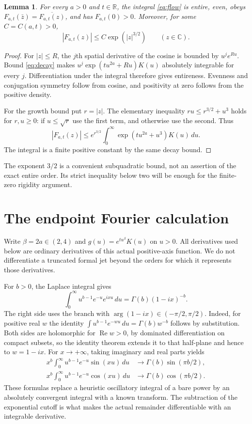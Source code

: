 \documentclass[11pt]{article}
\newtheorem{lemma}[theorem]{Lemma}
\theoremstyle{remark}\newtheorem{remark}[theorem]{Remark}
\newcommand{\R}{\mathbb R}\newcommand{\C}{\mathbb C}
\begin{document}
\begin{lemma}\label{lem:entire}
For every $a>0$ and $t\in\R$, the integral \eqref{eq:flow} is entire,
even, obeys $F_{a,t}(\bar z)=\overline{F_{a,t}(z)}$, and has
$F_{a,t}(0)>0$. Moreover, for some $C=C(a,t)>0$,
\begin{equation}\label{eq:growth}
 |F_{a,t}(z)|\leq C\exp(|z|^{3/2})\qquad(z\in\C).
\end{equation}
\end{lemma}
\begin{proof}
For $|z|\leq R$, the $j$th spatial derivative of the cosine is
bounded by $u^j e^{Ru}$. Bound \eqref{eq:decay} makes
$u^j\exp(tu^{2a}+Ru)K(u)$ absolutely integrable for every $j$.
Differentiation under the integral therefore gives entireness.
Evenness and conjugation symmetry follow from cosine, and positivity
at zero follows from the positive density.

For the growth bound put $r=|z|$. The elementary inequality
$ru\leq r^{3/2}+u^3$ holds for $r,u\geq0$: if $u\leq\sqrt r$
use the first term, and otherwise use the second. Thus
\[
 |F_{a,t}(z)|\leq e^{r^{3/2}}
 \int_0^\infty \exp(tu^{2a}+u^3)K(u)\,du.
\]
The integral is a finite positive constant by the same decay bound.
\end{proof}

The exponent $3/2$ is a convenient subquadratic bound, not an assertion
of the exact entire order. Its strict inequality below two will
be enough for the finite-zero rigidity argument.

\section{The endpoint Fourier calculation}
Write $\beta=2a\in(2,4)$ and
$g(u)=e^{tu^\beta}K(u)$ on $u>0$. All derivatives used below are
ordinary derivatives of this actual positive-axis function. We do
not differentiate a truncated formal jet beyond the orders for
which it represents those derivatives.

For $b>0$, the Laplace integral gives
\begin{equation}\label{eq:gamma}
 \int_0^\infty u^{b-1}e^{-u}e^{ixu}\,du
 =\Gamma(b)(1-ix)^{-b}.
\end{equation}
The right side uses the branch with $\arg(1-ix)\in(-\pi/2,\pi/2)$.
Indeed, for positive real $w$ the identity
$\int u^{b-1}e^{-wu}\,du=\Gamma(b)w^{-b}$ follows by substitution.
Both sides are holomorphic for $\operatorname{Re}w>0$, by dominated
differentiation on compact subsets, so the identity theorem extends
it to that half-plane and hence to $w=1-ix$.
For $x\to+\infty$, taking imaginary and real parts yields
\begin{align}
 x^b\int_0^\infty u^{b-1}e^{-u}\sin(xu)\,du
 &\longrightarrow\Gamma(b)\sin(\pi b/2),\label{eq:gammas}\\
 x^b\int_0^\infty u^{b-1}e^{-u}\cos(xu)\,du
 &\longrightarrow\Gamma(b)\cos(\pi b/2).\label{eq:gammac}
\end{align}
These formulas replace a heuristic oscillatory integral of a bare
power by an absolutely convergent integral with a known transform.
The subtraction of the exponential cutoff is what makes the actual
remainder differentiable with an integrable derivative.
\end{document}
